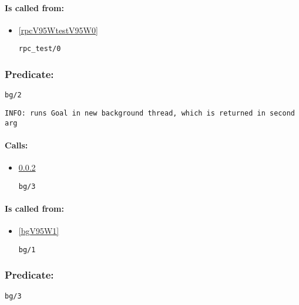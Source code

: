 \paragraph{Is called from:} 
\begin{itemize}
\item \ref{rpcV95WtestV95W0} 
\begin{verbatim}
rpc_test/0
\end{verbatim}

\end{itemize}

\subsubsection{Predicate:} \label{bgV95W2}

\begin{verbatim}
bg/2
\end{verbatim}

{\small \begin{verbatim}
INFO: runs Goal in new background thread, which is returned in second arg 

\end{verbatim}}
\paragraph{Calls:} 
\begin{itemize}
\item \ref{bgV95W3} 
\begin{verbatim}
bg/3
\end{verbatim}

\end{itemize}
\paragraph{Is called from:} 
\begin{itemize}
\item \ref{bgV95W1} 
\begin{verbatim}
bg/1
\end{verbatim}

\end{itemize}

\subsubsection{Predicate:} \label{bgV95W3}

\begin{verbatim}
bg/3
\end{verbatim}

